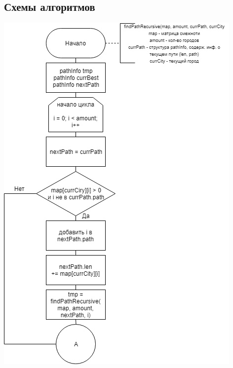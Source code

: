 \documentclass[12pt]{report}
\begin{document}
	\subsection{Схемы алгоритмов}
	\begin{center}
		\includegraphics[scale=0.7]{Rec1.png}
		

\end{center}
\end{document}
